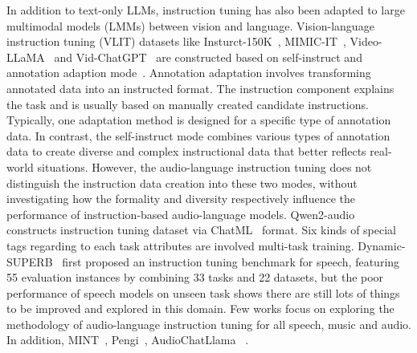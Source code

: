 In addition to text-only LLMs, instruction tuning has also been adapted to large multimodal models (LMMs) between vision and language. Vision-language instruction tuning (VLIT) datasets like Insturct-150K~\citep{liu2023visualinstructiontuning, liu2024improvedbaselinesvisualinstruction}, MIMIC-IT~\citep{li2023mimic}, Video-LLaMA~\citep{zhang2023videollama} and Vid-ChatGPT~\citep{maaz2024videochatgptdetailedvideounderstanding} are constructed based on self-instruct and annotation adaption mode~\citep{li2023visionlanguagereview}. Annotation adaptation involves transforming annotated data into an instructed format. The instruction component explains the task and is usually based on manually created candidate instructions. Typically, one adaptation method is designed for a specific type of annotation data. In contrast, the self-instruct mode combines various types of annotation data to create diverse and complex instructional data that better reflects real-world situations. However, the audio-language instruction tuning does not distinguish the instruction data creation into these two modes, without investigating how the formality and diversity respectively influence the performance of instruction-based audio-language models.
Qwen2-audio~\citep{chu2023qwen} constructs instruction tuning dataset via ChatML~\citep{achiam2023gpt} format. Six kinds of special tags regarding to each task attributes are involved multi-task training. Dynamic-SUPERB~\citep{huang2024dynamicsuperbdynamiccollaborativecomprehensive} first proposed an instruction tuning benchmark for speech, featuring 55 evaluation instances by combining 33 tasks and 22 datasets, but the poor performance of speech models on unseen task shows there are still lots of things to be improved and explored in this domain. Few works focus on exploring the methodology of audio-language instruction tuning for all speech, music and audio. In addition, MINT~\citep{zhao2024mint}, Pengi~\citep{deshmukh2023pengi}, AudioChatLlama~\citep{fathullah2024audiochatllama} . %

